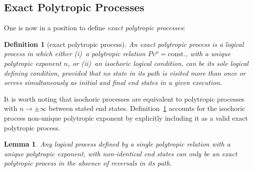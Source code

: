 \documentclass[fleqn,11pt]{SelfArx}
\newtheorem{definition}{Definition}
\newtheorem{lemma}{Lemma}
\begin{document}
    \subsection{Exact Polytropic Processes}

    One is now in a position to define \emph{exact polytropic processes}:

    \begin{definition}[exact polytropic process]\label{def:exact.poly.proc}
        An exact polytropic process is a  logical  process  in  which  either  (i)~a  polytropic
        relation $Pv^n = \mbox{const.}$, with a  unique  polytropic  exponent  $n$,  or  (ii)~an
        isochoric logical condition, can be its sole logical defining condition,  provided  that
        no state in its path is visited more than once or serves simultaneously as  initial  and
        final end states in a given execution.
    \end{definition}

    It is worth noting that isochoric processes are equivalent to polytropic processes  with  $n
    \to \pm\infty$ between stated end states. Definition~\ref{def:exact.poly.proc} accounts  for
    the isochoric process non-unique polytropic exponent by explicitly including it as  a  valid
    exact polytropic process.

    \begin{lemma}\label{lemm:no.reversal}
        Any logical process defined by a single polytropic relation  with  a  unique  polytropic
        exponent, with non-identical end states can only be an exact polytropic process  in  the
        absence of reversals in its path.
    \end{lemma}
\end{document}
